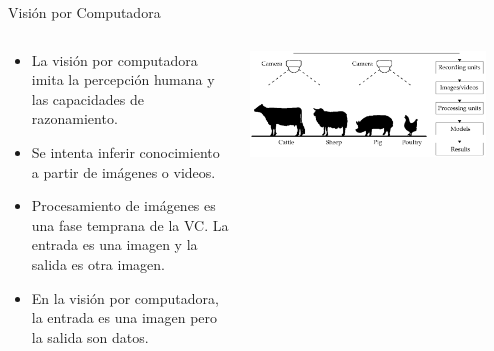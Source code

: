 
\begin{frame}{Visión por Computadora}
\begin{columns}
\begin{column}{0.60\textwidth}
    \begin{center}
\begin{itemize}
\item La visión por computadora imita la percepción humana y las capacidades de razonamiento.
\item Se intenta inferir conocimiento a partir de imágenes o videos.
\item Procesamiento de imágenes es una fase temprana de la VC. La entrada es una imagen y la salida es otra imagen.
\item En la visión por computadora, la entrada es una imagen pero la salida son datos. 
\end{itemize}
     \end{center}

\end{column}
\begin{column}{0.40\textwidth}  
    \begin{center}
     \includegraphics[width=0.9\textwidth]{Figs/VC}
     \end{center}
\end{column}
\end{columns}
\end{frame}

